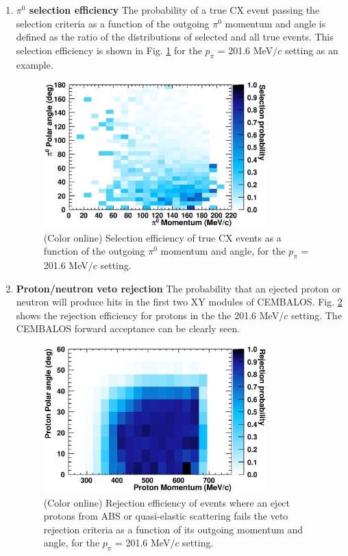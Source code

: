 \begin{enumerate}
\item{{\bf $\pi^0$ selection efficiency} The probability of a true CX event passing the selection criteria as a function of the outgoing $\pi^0$ momentum and angle is defined as the ratio of the distributions of selected and all true events. This selection efficiency is shown in Fig. \ref{fig:pi0_selection} for the $p_{\pi}$ = 201.6 MeV$/c$ setting as an example.}

\begin{figure}[h]
 \includegraphics[width=86mm]{figures/Pi0SelectionEfficiency_200.eps}
 \caption{(Color online) Selection efficiency of true CX events as a function of the outgoing $\pi^{0}$ momentum and angle, for the $p_{\pi}$ = 201.6 MeV$/c$ setting.}
 \label{fig:pi0_selection}
\end{figure}

\item{{\bf Proton/neutron veto rejection} The probability that an ejected proton or neutron will produce hits in the first two XY modules of CEMBALOS. Fig. \ref{fig:proton_rejection} shows the rejection efficiency for protons in the the 201.6 MeV$/c$ setting. The CEMBALOS forward acceptance can be clearly seen.}

\begin{figure}[h]
 \includegraphics[width=86mm]{figures/ProtonRejectionEfficiency_200.eps}
 \caption{(Color online) Rejection efficiency of events where an eject protons from ABS or quasi-elastic scattering fails the veto rejection criteria as a function of its outgoing  momentum and angle, for the $p_{\pi}$ = 201.6 MeV$/c$ setting.}
 \label{fig:proton_rejection}
\end{figure}


\end{enumerate}
